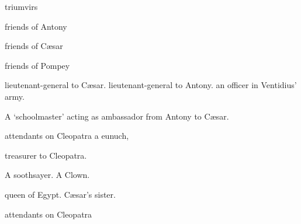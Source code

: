 \documentclass{book}
\begin{document}
\begin {DramatisPersonae}

\begin {Characters} {triumvirs}
\end{Characters}


\begin{Characters}  {friends of Antony}
\end{Characters}

\begin{Characters}  {friends of C\ae sar}
\end{Characters}

\begin{Characters}  {friends of Pompey}
\end{Characters}

 lieutenant-general to C\ae sar. 
 lieutenant-general to Antony.
 an officer in Ventidius' army.

\begin{unnamed}
A `schoolmaster' acting as ambassador from Antony to C\ae sar.
\end{unnamed}

\begin{Characters} [.85]{attendants on Cleopatra} 
 a eunuch, 
\end{Characters}

 treasurer to Cleopatra.

\begin{unnamed}
  A soothsayer.
  A Clown.
\end{unnamed}


 queen of Egypt.
 C\ae sar's sister.

\begin{Characters} [.8]{attendants on Cleopatra} 
\end{Characters} 

\Facies {}


\end {DramatisPersonae}
\end{document}
